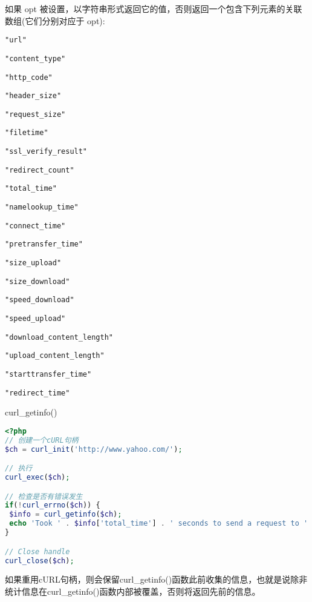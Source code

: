 如果 opt 被设置，以字符串形式返回它的值，否则返回一个包含下列元素的关联数组(它们分别对应于 opt):


\begin{compactitem}
\item \texttt{"url"}
\item \texttt{"content\_type"}
\item \texttt{"http\_code"}
\item \texttt{"header\_size"}
\item \texttt{"request\_size"}
\item \texttt{"filetime"}
\item \texttt{"ssl\_verify\_result"}
\item \texttt{"redirect\_count"}
\item \texttt{"total\_time"}
\item \texttt{"namelookup\_time"}
\item \texttt{"connect\_time"}
\item \texttt{"pretransfer\_time"}
\item \texttt{"size\_upload"}
\item \texttt{"size\_download"}
\item \texttt{"speed\_download"}
\item \texttt{"speed\_upload"}
\item \texttt{"download\_content\_length"}
\item \texttt{"upload\_content\_length"}
\item \texttt{"starttransfer\_time"}
\item \texttt{"redirect\_time"}
\end{compactitem}


\begin{example}
curl\_getinfo()
\begin{lstlisting}[language=PHP]
<?php
// 创建一个cURL句柄
$ch = curl_init('http://www.yahoo.com/');

// 执行
curl_exec($ch);

// 检查是否有错误发生
if(!curl_errno($ch)) {
 $info = curl_getinfo($ch);
 echo 'Took ' . $info['total_time'] . ' seconds to send a request to ' . $info['url'];
}

// Close handle
curl_close($ch);
\end{lstlisting}
\end{example}



如果重用cURL句柄，则会保留curl\_getinfo()函数此前收集的信息，也就是说除非统计信息在curl\_getinfo()函数内部被覆盖，否则将返回先前的信息。



